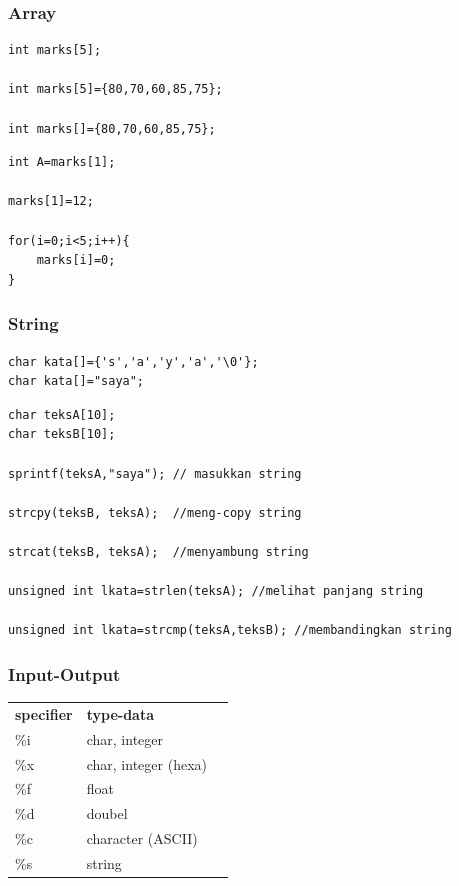 \documentclass[12pt,]{article}
\begin{document}
	\subsubsection{Array}
	\begin{verbatim}
int marks[5];

int marks[5]={80,70,60,85,75};

int marks[]={80,70,60,85,75};
	\end{verbatim}

	\begin{verbatim}
int A=marks[1];

marks[1]=12;

for(i=0;i<5;i++){
	marks[i]=0;
}
	\end{verbatim}

	\subsubsection{String}
	\begin{verbatim}
char kata[]={'s','a','y','a','\0'};
char kata[]="saya";
	\end{verbatim}

	\begin{verbatim}
char teksA[10];
char teksB[10];

sprintf(teksA,"saya"); // masukkan string

strcpy(teksB, teksA);  //meng-copy string

strcat(teksB, teksA);  //menyambung string

unsigned int lkata=strlen(teksA); //melihat panjang string

unsigned int lkata=strcmp(teksA,teksB); //membandingkan string
	\end{verbatim}

	\subsubsection{Input-Output}
	\begin{table}[H]
		\begin{tabular}{|l|l|l}
			\cline{1-2}
			\textbf{specifier} & \textbf{type-data} \\ \cline{1-2}
			\%i & char, integer \\ \cline{1-2}
			\%x & char, integer (hexa) \\ \cline{1-2}
			\%f & float \\ \cline{1-2}
			\%d & doubel \\ \cline{1-2}
			\%c & character (ASCII) \\ \cline{1-2}
			\%s & string \\ \cline{1-2}
		\end{tabular}
	\end{table}
\end{document}
